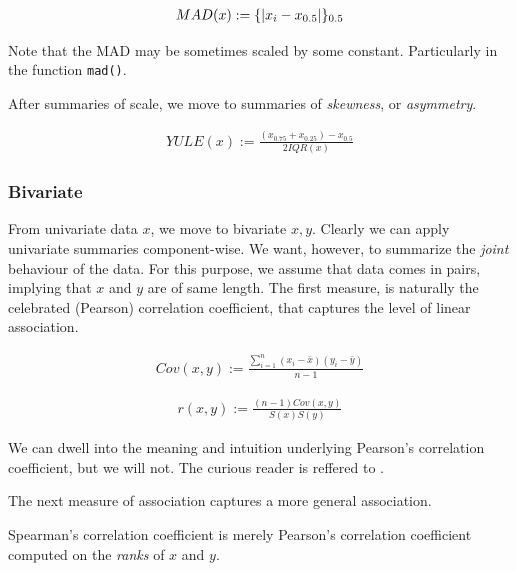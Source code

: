 \documentclass[12pt,a4paper]{report}
\begin{document}
\begin{definition}
\begin{align}
	MAD(x):= \{ |x_i-x_{0.5}| \}_{0.5}
\end{align}
\end{definition}
Note that the MAD may be sometimes scaled by some constant. Particularly in the \R function \texttt{mad()}. 


After summaries of scale, we move to summaries of \emph{skewness}, or \emph{asymmetry}.

\begin{definition}
\begin{align}
	YULE(x):= \frac{(x_{0.75}+x_{0.25})-x_{0.5}}{2 IQR(x)}
\end{align}
\end{definition}

 


\subsubsection{Bivariate}
From univariate data $x$, we move to bivariate $x,y$.
Clearly we can apply univariate summaries component-wise. 
We want, however, to summarize the \emph{joint} behaviour of the data. 
For this purpose, we assume that data comes in pairs, implying that $x$ and $y$ are of same length.
The first measure, is naturally the celebrated (Pearson) correlation coefficient, that captures the level of linear association.


\begin{definition}
\begin{align}
	Cov(x,y):= \frac{\sum_{i=1}^{n} (x_i-\bar{x})(y_i-\bar{y})}{n-1}
\end{align}
\end{definition}



\begin{definition}
\begin{align}
	r(x,y):= \frac{(n-1) Cov(x,y)}{S(x) S(y)}
\end{align}
\end{definition}
We can dwell into the meaning and intuition underlying Pearson's correlation coefficient, but we will not. 
The curious reader is reffered to \cite{rodgers_thirteen_1988}.

The next measure of association captures a more general association.
\begin{definition}
Spearman's correlation coefficient is merely Pearson's correlation coefficient computed on the \emph{ranks} of $x$ and $y$. 
\end{definition}
\end{document}
